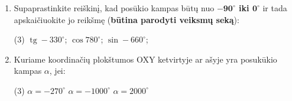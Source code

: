 \documentclass[a4paper]{article}
\DeclareMathOperator{\tg}{tg}
\begin{document}
\begin{enumerate}
      \item Supaprastinkite reiškinį, kad posūkio kampas būtų nuo
            \textbf{$\boldsymbol{-90^\circ}$
                  iki  $\boldsymbol{0^\circ}$} ir tada apskaičiuokite jo
            reikšmę
            (\textbf{būtina parodyti veiksmų seką}):
            \begin{tasks}[item-format={\normalfont},
                        after-item-skip=4mm](3)
                  \task $\tg -330^\circ$;
                  \task $\cos 780^\circ$;
                  \task $\sin -660^\circ$;
            \end{tasks}

      \item Kuriame koordinačių plokštumos OXY ketvirtyje ar ašyje yra
            posukūkio kampas $\alpha$, jei:

            \begin{tasks}[item-format={\normalfont},
                        after-item-skip=4mm](3)
                  \task $\alpha = -270^\circ$
                  \task $\alpha = -1000^\circ$
                  \task $\alpha = 2000^\circ$
            \end{tasks}

\end{enumerate}
\end{document}
